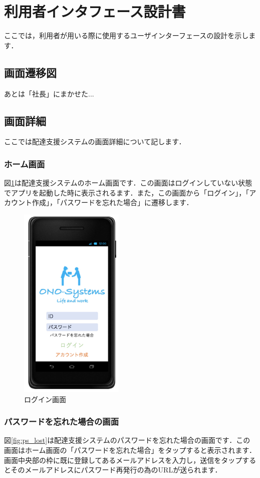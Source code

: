 \documentclass[a4j,titlepage]{jarticle}
\begin{document}
\section{利用者インタフェース設計書}
ここでは，利用者が用いる際に使用するユーザインターフェースの設計を示します．

\subsection{画面遷移図}
あとは「社長」にまかせた...

\subsection{画面詳細}
ここでは配達支援システムの画面詳細について記します．

\subsubsection{ホーム画面}
図\ref{fig:login}は配達支援システムのホーム画面です．この画面はログインしていない状態でアプリを起動した時に表示されるます．また，この画面から「ログイン」，「アカウント作成」，「パスワードを忘れた場合」に遷移します．

\begin{figure}[htbp]
 \begin{center}
  \includegraphics[width=50mm]{login}
	\caption{ログイン画面}
	\label{fig:login}
 \end{center}

\end{figure}


\subsubsection{パスワードを忘れた場合の画面}
図\ref{fig:ps_lost}は配達支援システムのパスワードを忘れた場合の画面です．この画面はホーム画面の「パスワードを忘れた場合」をタップすると表示されます．画面中央部の枠に既に登録してあるメールアドレスを入力し，送信をタップするとそのメールアドレスにパスワード再発行の為のURLが送られます．
\end{document}
